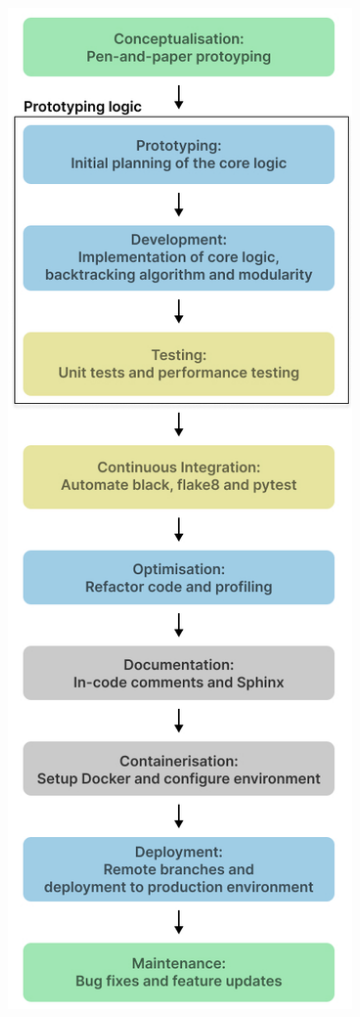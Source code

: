 \documentclass{report}
\begin{document}
\begin{figure}[htbp]
    \centering
    \begin{subfigure}[b]{0.14\textwidth}
        \centering
        \includegraphics[width=\textwidth]{Images/SDLC.jpg}

\end{subfigure}
\end{figure}
\end{document}
